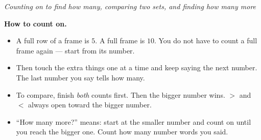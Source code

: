 \documentclass[12pt]{article}
\begin{document}

\begin{center}
\textit{Counting on to find how many, comparing two sets, and finding how many
more}
\end{center}

\noindent\textbf{How to count on.}
\begin{itemize}[leftmargin=1.2cm, itemsep=2pt, topsep=2pt]
\item A full row of a frame is $5$. A full frame is $10$. You do not have to
count a full frame again --- start from its number.
\item Then touch the extra things one at a time and keep saying the next
number. The last number you say tells how many.
\item To compare, finish \emph{both} counts first. Then the bigger number wins.
$>$ and $<$ always open toward the bigger number.
\item ``How many more?'' means: start at the smaller number and count on until
you reach the bigger one. Count how many number words you said.
\end{itemize}

\medskip


\end{document}
